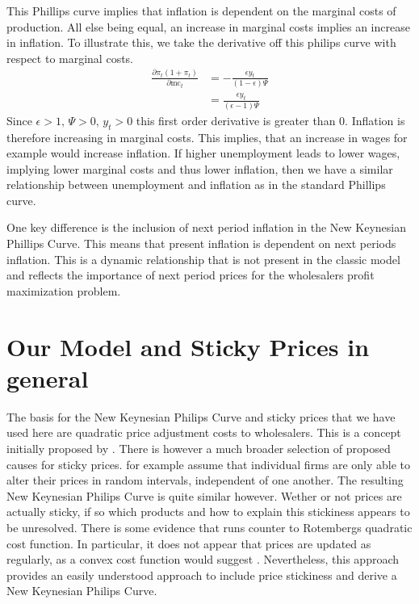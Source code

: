 \documentclass[11pt,a4paper,oneside]{book}
\begin{document}
This Phillips curve implies that inflation is dependent on the marginal costs of production. All else being equal, an increase in marginal costs implies an increase in inflation.
To illustrate this, we take the derivative off this philips curve with respect to marginal costs.
\begin{align*}
	\frac{\partial\pi _t(1+\pi_t)}{\partial \text{mc}_t} &= -\frac{\epsilon y_t}{(1-\epsilon)\Psi}\\
	&= \frac{\epsilon y_t}{(\epsilon-1)\Psi}
\end{align*}
Since $\epsilon>1,\,\Psi>0,\,y_t>0$ this first order derivative is greater than $0$. Inflation is therefore increasing in marginal costs. This implies, that an increase in wages for example would increase inflation. If higher unemployment leads to lower wages, implying lower marginal costs and thus lower inflation, then we have a similar relationship between unemployment and inflation as in the standard Phillips curve. 

One key difference is the inclusion of next period inflation in the New Keynesian Phillips Curve. This means that present inflation is dependent on next periods inflation. This is a dynamic relationship that is not present in the classic model and reflects the importance of next period prices for the wholesalers profit maximization problem.
\section{Our Model and Sticky Prices in general}
The basis for the New Keynesian Philips Curve and sticky prices that we have used here are quadratic price adjustment costs to wholesalers. This is a concept initially proposed by \cite{Rotemberg}. There is however a much broader selection of proposed causes for sticky prices.  \cite{CALVO1983383} for example assume that individual firms are only able to alter their prices in random intervals, independent of one another. The resulting New Keynesian Philips Curve is quite similar however.  Wether or not prices are actually sticky, if so which products and how to explain this stickiness appears to be unresolved. There is some evidence that runs counter to Rotembergs quadratic cost function. In particular, it does not appear that prices are updated as regularly, as a convex cost function would suggest \cite{KLENOW2010231}. Nevertheless, this approach provides an easily understood approach to include price stickiness and derive a New Keynesian Philips Curve.
\end{document}
